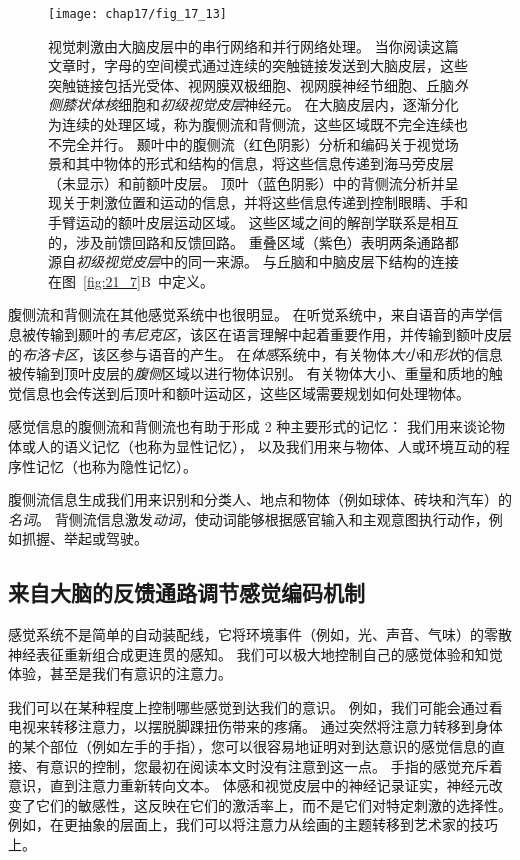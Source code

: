 \begin{figure}[htbp]
	\centering
	\texttt{[image: chap17/fig\_17\_13]}
	\caption{视觉刺激由大脑皮层中的串行网络和并行网络处理。
		当你阅读这篇文章时，字母的空间模式通过连续的突触链接发送到大脑皮层，这些突触链接包括光受体、视网膜双极细胞、视网膜神经节细胞、丘脑\textit{外侧膝状体核}细胞和\textit{初级视觉皮层}神经元。
		在大脑皮层内，逐渐分化为连续的处理区域，称为腹侧流和背侧流，这些区域既不完全连续也不完全并行。
		颞叶中的腹侧流（红色阴影）分析和编码关于视觉场景和其中物体的形式和结构的信息，将这些信息传递到海马旁皮层（未显示）和前额叶皮层。
		顶叶（蓝色阴影）中的背侧流分析并呈现关于刺激位置和运动的信息，并将这些信息传递到控制眼睛、手和手臂运动的额叶皮层运动区域。
		这些区域之间的解剖学联系是相互的，涉及前馈回路和反馈回路。
		重叠区域（紫色）表明两条通路都源自\textit{初级视觉皮层}中的同一来源。
		与丘脑和中脑皮层下结构的连接在图~\ref{fig:21_7}B~中定义\cite{albright2002contextual}。}
	\label{fig:17_13}
\end{figure}


腹侧流和背侧流在其他感觉系统中也很明显。
在听觉系统中，来自语音的声学信息被传输到颞叶的\textit{韦尼克区}，该区在语言理解中起着重要作用，并传输到额叶皮层的\textit{布洛卡区}，该区参与语音的产生。
在\textit{体感}系统中，有关物体\textit{大小}和\textit{形状}的信息被传输到顶叶皮层的\textit{腹侧}区域以进行物体识别。
有关物体大小、重量和质地的触觉信息也会传送到后顶叶和额叶运动区，这些区域需要规划如何处理物体。


感觉信息的腹侧流和背侧流也有助于形成 2 种主要形式的记忆：
我们用来谈论物体或人的语义记忆（也称为显性记忆），
以及我们用来与物体、人或环境互动的程序性记忆（也称为隐性记忆）。


腹侧流信息生成我们用来识别和分类人、地点和物体（例如球体、砖块和汽车）的\textit{名词}。
背侧流信息激发\textit{动词}，使动词能够根据感官输入和主观意图执行动作，例如抓握、举起或驾驶。



\subsection{来自大脑的反馈通路调节感觉编码机制}

感觉系统不是简单的自动装配线，它将环境事件（例如，光、声音、气味）的零散神经表征重新组合成更连贯的感知。
我们可以极大地控制自己的感觉体验和知觉体验，甚至是我们有意识的注意力。


我们可以在某种程度上控制哪些感觉到达我们的意识。
例如，我们可能会通过看电视来转移注意力，以摆脱脚踝扭伤带来的疼痛。
通过突然将注意力转移到身体的某个部位（例如左手的手指），您可以很容易地证明对到达意识的感觉信息的直接、有意识的控制，您最初在阅读本文时没有注意到这一点。
手指的感觉充斥着意识，直到注意力重新转向文本。
体感和视觉皮层中的神经记录证实，神经元改变了它们的敏感性，这反映在它们的激活率上，而不是它们对特定刺激的选择性。
例如，在更抽象的层面上，我们可以将注意力从绘画的主题转移到艺术家的技巧上。


